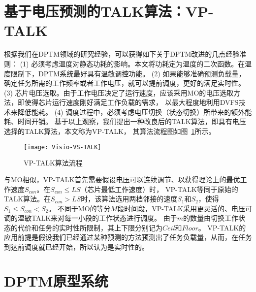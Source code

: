 \section{基于电压预测的TALK算法：VP-TALK}
\label{sec:vp-talk}
根据我们在DPTM领域的研究经验，可以获得如下关于DPTM改进的几点经验准则：
(1)	必须考虑温度对静态功耗的影响。本文将功耗定为温度的二次函数。在温度限制下，DPTM系统最好具有温敏调控功能。
(2)	如果能够准确预测负载量，确定任务所需的工作频率或者工作电压，就可以提前调度，更好的满足实时性。
(3)	芯片电压选取。由于工作电压决定了运行速度，应该采用MO的电压选取方法，即使得芯片运行速度刚好满足工作负载的需求， 以最大程度地利用DVFS技术来降低能耗。
(4)	调度过程中，必须考虑电压切换（状态切换）所带来的额外能耗、时间开销。
基于以上观察，我们提出一种改良后的TALK算法，即具有电压选择的TALK算法，本文称为VP-TALK， 其算法流程图如图~\ref{fig:vp-talk}所示。
\begin{figure}[H] %
  \centering
  \texttt{[image: Visio-VS-TALK]}
  \caption{VP-TALK算法流程}
  \label{fig:vp-talk}
\end{figure}
与MO相似，VP-TALK首先需要假设电压可以连续调节、以获得理论上的最优工作速度$S_{con}$。在$S_{con}\leq LS$（芯片最低工作速度）时， VP-TALK等同于原始的TALK算法。在$S_{con}>{LS}$时，该算法选用两档邻接的速度$S_1$和$S_2$，使得$S_1\leq S_{con}<S_2$。 不同于MO的等分$M$段时间段，VP-TALK采用更灵活的、电压可调的温敏TALK来对每一小段的工作状态进行调度。 由于$m$的数量由切换工作状态的代价和任务的实时性所限制，其上下限分别记为$Ceil$和$Floor$。 VP-TALK的应用前提是假设我们已经通过某种预测的方法预测出了任务负载量，从而，在任务到达前调度就已经开始，所以认为是实时性的。

\section{DPTM原型系统}
\label{DPTM-system}
